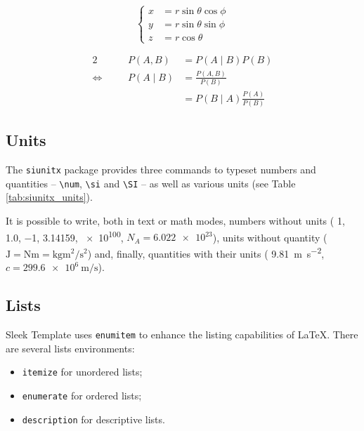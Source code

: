 \documentclass[a4paper, 12pt]{report}
\def\tbs{\textbackslash}
\begin{document}
    \begin{equation}
        \left\{
        \begin{aligned}
            x & = r \sin \theta \cos \phi \\
            y & = r \sin \theta \sin \phi \\
            z & = r \cos \theta
        \end{aligned}
        \right.
    \end{equation}

    \begin{alignat*}{2}
                              & & P(A, B)  & = P(A \mid B) P(B)                        \\
        \Leftrightarrow \quad & & P(A \mid B) & = \frac{P(A, B)}{P(B)}                 \\
                              & &          & = P(B \mid A) \frac{P(A)}{P(B)}
    \end{alignat*}

    \subsection{Units}

    The \texttt{siunitx} package provides three commands to typeset numbers and quantities -- \texttt{\tbs{}num}, \texttt{\tbs{}si} and \texttt{\tbs{}SI} -- as well as various units (see Table \ref{tab:siunitx_units}).

    It is possible to write, both in text or math modes, numbers without units (\eg{} \num{1}, \num{1.0}, \num{-1}, \num{3.14159}, \num{e100}, $N_A = \num{6.022e23}$), units without quantity (\eg{} $\si{\joule} = \si{\newton\meter} = \si{\kilogram\meter\squared\per\second\squared}$) and, finally, quantities with their units (\eg{} \SI{9.81}{\meter\per\second\squared}, $c = \SI{299.6e6}{\meter\per\second}$).

    \subsection{Lists}

    Sleek Template uses \texttt{enumitem} to enhance the listing capabilities of \LaTeX{}. There are several lists environments:
    \begin{itemize}[noitemsep]
        \item \texttt{itemize} for unordered lists;
        \item \texttt{enumerate} for ordered lists;
        \item \texttt{description} for descriptive lists.
    \end{itemize}
\end{document}
